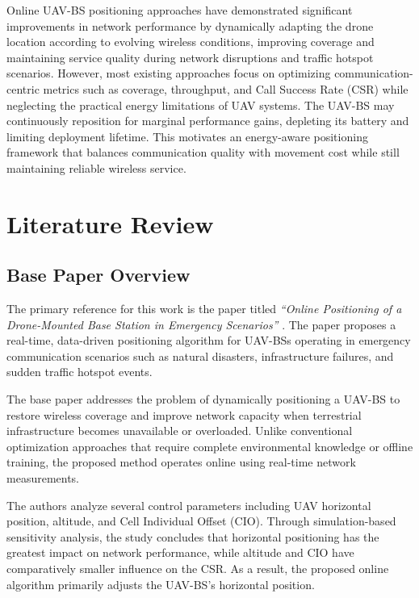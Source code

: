 \documentclass[12pt]{report}
\begin{document}
Online UAV-BS positioning approaches have demonstrated significant improvements in network performance by dynamically adapting the drone location according to evolving wireless conditions, improving coverage and maintaining service quality during network disruptions and traffic hotspot scenarios. However, most existing approaches focus on optimizing communication-centric metrics such as coverage, throughput, and Call Success Rate (CSR) while neglecting the practical energy limitations of UAV systems. The UAV-BS may continuously reposition for marginal performance gains, depleting its battery and limiting deployment lifetime. This motivates an energy-aware positioning framework that balances communication quality with movement cost while still maintaining reliable wireless service.
\chapter{Literature Review}
\label{ch:litreview}

\section{Base Paper Overview}

The primary reference for this work is the paper titled \textit{``Online Positioning of a Drone-Mounted Base Station in Emergency Scenarios''} \cite{pijnappel2024online}. The paper proposes a real-time, data-driven positioning algorithm for UAV-BSs operating in emergency communication scenarios such as natural disasters, infrastructure failures, and sudden traffic hotspot events.

The base paper addresses the problem of dynamically positioning a UAV-BS to restore wireless coverage and improve network capacity when terrestrial infrastructure becomes unavailable or overloaded. Unlike conventional optimization approaches that require complete environmental knowledge or offline training, the proposed method operates online using real-time network measurements.

The authors analyze several control parameters including UAV horizontal position, altitude, and Cell Individual Offset (CIO). Through simulation-based sensitivity analysis, the study concludes that horizontal positioning has the greatest impact on network performance, while altitude and CIO have comparatively smaller influence on the CSR. As a result, the proposed online algorithm primarily adjusts the UAV-BS's horizontal position.
\end{document}
